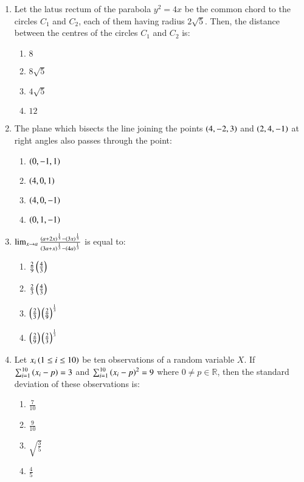 \documentclass[journal,9pt,twocolumn]{IEEEtran}
\begin{document}
\begin{enumerate}
\item Let the latus rectum of the parabola $y^2 = 4x$ be the common chord to the circles $C_1$ and $C_2$, each of them having radius $2\sqrt{5}$. Then, the distance between the centres of the circles $C_1$ and $C_2$ is:

\begin{multicols}{4}
\begin{enumerate}
    \item $8$
    \item $8\sqrt{5}$
    \item $4\sqrt{5}$
    \item $12$
\end{enumerate}
\end{multicols}

\item The plane which bisects the line joining the points $\left(4, -2, 3\right)$ and $\left(2, 4, -1\right)$ at right angles also passes through the point:

\begin{multicols}{2}
\begin{enumerate}
    \item $\left(0, -1, 1\right)$
    \item $\left(4, 0, 1\right)$
    \item $\left(4, 0, -1\right)$
    \item $\left(0, 1, -1\right)$
\end{enumerate}
\end{multicols}

\item $\lim_{x \to a} \frac{\left(a + 2x\right)^{\frac{1}{3}} - \left(3x\right)^{\frac{1}{3}}}{\left(3a + x\right)^{\frac{1}{3}} - \left(4a\right)^{\frac{1}{3}}}$ is equal to:
\begin{multicols}{2}
\begin{enumerate}
    \item $\frac{2}{9} \left(\frac{4}{3}\right)$
    \item $\frac{2}{3} \left(\frac{4}{3}\right)$
    \item $\left(\frac{2}{3}\right) \left(\frac{2}{9}\right)^{\frac{1}{3}}$
    \item $\left(\frac{2}{9}\right) \left(\frac{2}{3}\right)^{\frac{1}{3}}$
\end{enumerate}
\end{multicols}

\item Let $x_{i} \left(1 \leq i \leq 10\right)$ be ten observations of a random variable $X$. If
$\sum_{i=1}^{10}\left(x_{i}-p\right)=3$
and
$\sum_{i=1}^{10}\left(x_{i}-p\right)^{2}=9$
where $0 \neq p \in \mathbb{R}$, then the standard deviation of these observations is:
\begin{multicols}{4}
\begin{enumerate}
    \item  $\frac{7}{10}$
    \item $\frac{9}{10}$
    \item $\sqrt{\frac{3}{5}}$
    \item  $\frac{4}{5}$
\end{enumerate}
\end{multicols}


\end{enumerate}
\end{document}
